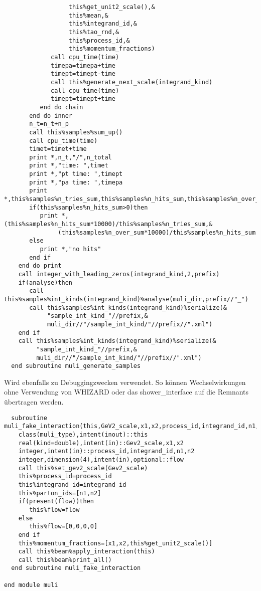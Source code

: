 \begin{Verbatim}
                  this%get_unit2_scale(),&
                  this%mean,&
                  this%integrand_id,&
                  this%tao_rnd,&
                  this%process_id,&
                  this%momentum_fractions)
             call cpu_time(time)
             timepa=timepa+time
             timept=timept-time
             call this%generate_next_scale(integrand_kind)
             call cpu_time(time)
             timept=timept+time
          end do chain
       end do inner
       n_t=n_t+n_p
       call this%samples%sum_up()
       call cpu_time(time)
       timet=timet+time
       print *,n_t,"/",n_total
       print *,"time: ",timet
       print *,"pt time: ",timept
       print *,"pa time: ",timepa       
       print *,this%samples%n_tries_sum,this%samples%n_hits_sum,this%samples%n_over_sum
       if(this%samples%n_hits_sum>0)then
          print *,(this%samples%n_hits_sum*10000)/this%samples%n_tries_sum,&
               (this%samples%n_over_sum*10000)/this%samples%n_hits_sum
       else
          print *,"no hits"
       end if
    end do print
    call integer_with_leading_zeros(integrand_kind,2,prefix)
    if(analyse)then
       call this%samples%int_kinds(integrand_kind)%analyse(muli_dir,prefix//"_")
       call this%samples%int_kinds(integrand_kind)%serialize(&
            "sample_int_kind_"//prefix,&
            muli_dir//"/sample_int_kind/"//prefix//".xml")
    end if
    call this%samples%int_kinds(integrand_kind)%serialize(&
         "sample_int_kind_"//prefix,&
         muli_dir//"/sample_int_kind/"//prefix//".xml")
  end subroutine muli_generate_samples
\end{Verbatim}

Wird ebenfalls zu Debuggingzwecken verwendet. So können Wechselwirkungen ohne Verwendung von WHIZARD oder das shower\_interface auf die Remnants übertragen werden.
\begin{Verbatim}
  subroutine muli_fake_interaction(this,GeV2_scale,x1,x2,process_id,integrand_id,n1,n2,flow)
    class(muli_type),intent(inout)::this
    real(kind=double),intent(in)::Gev2_scale,x1,x2
    integer,intent(in)::process_id,integrand_id,n1,n2
    integer,dimension(4),intent(in),optional::flow
    call this%set_gev2_scale(Gev2_scale)
    this%process_id=process_id
    this%integrand_id=integrand_id
    this%parton_ids=[n1,n2]
    if(present(flow))then
       this%flow=flow
    else
       this%flow=[0,0,0,0]
    end if
    this%momentum_fractions=[x1,x2,this%get_unit2_scale()]
    call this%beam%apply_interaction(this)
    call this%beam%print_all()
  end subroutine muli_fake_interaction

end module muli

\end{Verbatim}
